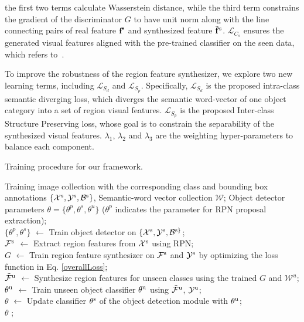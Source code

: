 \documentclass[10pt,twocolumn,letterpaper]{article}
\begin{document}
the first two terms calculate Wasserstein distance, while the third term constrains the gradient of the discriminator $G$ to have unit norm along with the line connecting pairs of real feature $\textbf{f}^{\rm s}$ and synthesized feature $\mathbf{\tilde{f}}^{\rm s}$. $\mathcal{L}_{C_s}$ ensures the generated visual features aligned with the pre-trained classifier on the seen data, which refers to~\cite{hayat2020synthesizing}.

To improve the robustness of the region feature synthesizer, we explore two new learning terms, including $\mathcal{L}_{S_d}$ and $\mathcal{L}_{S_p}$. Specifically, $\mathcal{L}_{S_d}$ is the proposed intra-class semantic diverging loss, which diverges the semantic word-vector of one object category into a set of region visual features. $\mathcal{L}_{S_p}$ is the proposed Inter-class Structure Preserving loss, whose goal is to constrain the separability of the synthesized visual features. $\lambda_1$, $\lambda_2$ and $\lambda_3$ are the weighting hyper-parameters to balance each component. 

\begin{algorithm}[t]
  \renewcommand{\algorithmicrequire}{\textbf{Input:}}
  \renewcommand{\algorithmicensure}{\textbf{Output:}}
  \caption{Training procedure for our framework.}
  \begin{algorithmic}[1]
\Require
      Training image collection with the corresponding class and bounding box annotations $\{\mathcal{X}^{\rm s},\mathcal{Y}^{\rm s},\mathcal{B}^{\rm s}\}$, Semantic-word vector collection $\mathcal{W}$;
    \Ensure
     Object detector parameters $\theta=\{\theta^{p},\theta^s,\theta^u\}$ ($\theta^{p}$ indicates the parameter for RPN proposal extraction);\\
     $\{\theta^{p},\theta^s\}$ $\leftarrow$ Train object detector on $\{\mathcal{X}^{\rm s},\mathcal{Y}^{\rm s},\mathcal{B}^{\rm s\}}$;\\
     $\mathcal{F}^{\rm s}$ $\leftarrow$ Extract region features from $\mathcal{X}^{\rm s}$ using RPN;\\
$G$ $\leftarrow$ Train region feature synthesizer on $\mathcal{F}^{\rm s}$ and $\mathcal{Y}^{\rm s}$ by optimizing the loss function in Eq. \ref{overallLoss};\\
     $\mathcal{\tilde{F}}^{\rm u}$ $\leftarrow$ Synthesize region features for unseen classes using the trained $G$ and $\mathcal{W}^{u}$;\\
     $\theta^{\rm u}$ $\leftarrow$ Train unseen object classifier $\theta^{\rm u}$ using $\mathcal{\tilde{F}}^{\rm u}$, $\mathcal{Y}^{\rm u}$;\\
     $\theta$ $\leftarrow$ Update classifier $\theta^{\rm s}$ of the object detection module with $\theta^{\rm u}$;\\
\Return $\theta$ ;
    \label{implementation-process}
  \end{algorithmic}
\end{algorithm}
\end{document}
